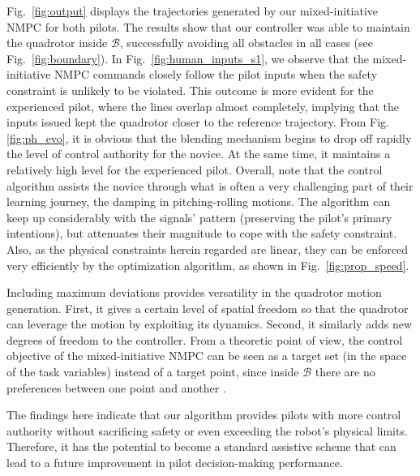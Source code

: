Fig.~\ref{fig:output} displays the trajectories generated by our mixed-initiative NMPC for both pilots. The results show that our controller was able to maintain the quadrotor inside $\mathcal{B}$, successfully avoiding all obstacles in all cases (see Fig.~\ref{fig:boundary}). In Fig.~\ref{fig:human_inputs_s1}, we observe that the mixed-initiative NMPC commands closely follow the pilot inputs when the safety constraint is unlikely to be violated. This outcome is more evident for the experienced pilot, where the lines overlap almost completely, implying that the inputs issued kept the quadrotor closer to the reference trajectory. From Fig. \ref{fig:ph_evo}, it is obvious that the blending mechanism begins to drop off rapidly the level of control authority for the novice. At the same time, it maintains a relatively high level for the experienced pilot. Overall, note that the control algorithm assists the novice through what is often a very challenging part of their learning journey, the damping in pitching-rolling motions. The algorithm can keep up considerably with the signals' pattern (preserving the pilot's primary intentions), but attenuates their magnitude to cope with the safety constraint. Also, as the physical constraints herein regarded are linear, they can be enforced very efficiently by the optimization algorithm, as shown in Fig.~\ref{fig:prop_speed}.

Including maximum deviations provides versatility in the quadrotor motion generation. First, it gives a certain level of spatial freedom so that the quadrotor can leverage the motion by exploiting its dynamics. Second, it similarly adds new degrees of freedom to the controller. From a theoretic point of view, the control objective of the mixed-initiative NMPC can be seen as a target set (in the space of the task variables) instead of a target point, since inside $\mathcal{B}$ there are no preferences between one point and another \cite{camacho2010}.

The findings here indicate that our algorithm provides pilots with more control authority without sacrificing safety or even exceeding the robot's physical limits. Therefore, it has the potential to become a standard assistive scheme that can lead to a future improvement in pilot decision-making performance.

